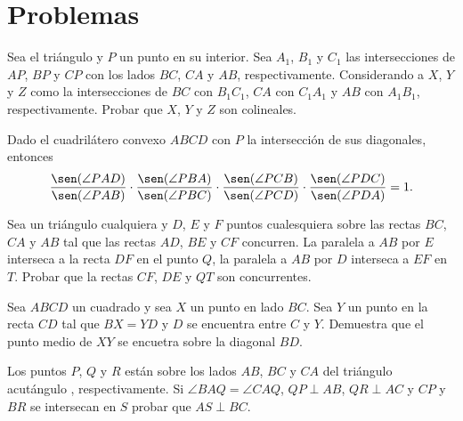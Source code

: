 \newpage
\section{Problemas}

\begin{section-problem}
    Sea el triángulo  y $P$ un punto en su interior.
    Sea $A_1$, $B_1$ y $C_1$ las intersecciones de $AP$, $BP$ y $CP$ con los lados $BC$, $CA$ y $AB$, respectivamente.
    Considerando a $X$, $Y$ y $Z$ como la intersecciones de $BC$ con $B_1 C_1$, $CA$ con $C_1 A_1$ y $AB$ con $A_1 B_1$, respectivamente.
    Probar que $X$, $Y$ y $Z$ son colineales.
\end{section-problem}

\begin{section-problem}
    Dado el cuadrilátero convexo $ABCD$ con $P$ la intersección de sus diagonales, entonces
    \[
        \frac{\sen(\angle PAD)}{\sen(\angle PAB)} \cdot \frac{\sen(\angle PBA)}{\sen(\angle PBC)} \cdot \frac{\sen(\angle PCB)}{\sen(\angle PCD)} \cdot \frac{\sen(\angle PDC)}{\sen(\angle PDA)} = 1.
    \]
\end{section-problem}

\begin{section-problem}
    Sea  un triángulo cualquiera y $D$, $E$ y $F$ puntos cualesquiera sobre las rectas $BC$, $CA$ y $AB$ tal que las rectas $AD$, $BE$ y $CF$ concurren.
    La paralela a $AB$ por $E$ interseca a la recta $DF$ en el punto $Q$, la paralela a $AB$ por $D$ interseca a $EF$ en $T$.
    Probar que la rectas $CF$, $DE$ y $QT$ son concurrentes.
\end{section-problem}

\begin{section-problem}
    Sea $ABCD$ un cuadrado y sea $X$ un punto en lado $BC$.
    Sea $Y$ un punto en la recta $CD$ tal que $BX = YD$ y $D$ se encuentra entre $C$ y $Y$.
    Demuestra que el punto medio de $XY$ se encuetra sobre la diagonal $BD$.
\end{section-problem}

\begin{section-problem}
    Los puntos $P$, $Q$ y $R$ están sobre los lados $AB$, $BC$ y $CA$ del triángulo acutángulo , respectivamente.
    Si $\angle BAQ = \angle CAQ$, $QP \perp AB$, $QR \perp AC$ y $CP$ y $BR$ se intersecan en $S$ probar que $AS \perp BC$.
\end{section-problem}

